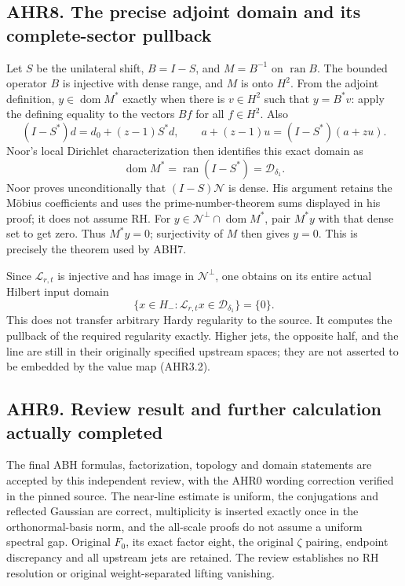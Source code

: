 \subsection{AHR8. The precise adjoint domain and its complete-sector
pullback}\label{ahr8.-the-precise-adjoint-domain-and-its-complete-sector-pullback}

Let \(S\) be the unilateral shift, \(B=I-S\), and \(M=B^{-1}\) on
\(\operatorname{ran}B\). The bounded operator \(B\) is injective with
dense range, and \(M\) is onto \(H^2\). From the adjoint definition,
\(y\in\operatorname{dom}M^*\) exactly when there is \(v\in H^2\) such
that \(y=B^*v\): apply the defining equality to the vectors \(Bf\) for
all \(f\in H^2\). Also \[
(I-S^*)d=d_0+(z-1)S^*d,
\qquad a+(z-1)u=(I-S^*)(a+zu).
\] Noor's local Dirichlet characterization then identifies this exact
domain as \[
\operatorname{dom}M^*=\operatorname{ran}(I-S^*)=\mathcal D_{\delta_1}.
\tag{AHR8.1}
\] Noor proves unconditionally that \((I-S)\mathcal N\) is dense. His
argument retains the Möbius coefficients and uses the
prime-number-theorem sums displayed in his proof; it does not assume RH.
For \(y\in\mathcal N^\perp\cap\operatorname{dom}M^*\), pair \(M^*y\)
with that dense set to get zero. Thus \(M^*y=0\); surjectivity of \(M\)
then gives \(y=0\). This is precisely the theorem used by ABH7.

Since \(\mathcal L_{r,t}\) is injective and has image in
\(\mathcal N^\perp\), one obtains on its entire actual Hilbert input
domain \[
\{x\in H_-:\mathcal L_{r,t}x\in\mathcal D_{\delta_1}\}=\{0\}.
\tag{AHR8.2}
\] This does not transfer arbitrary Hardy regularity to the source. It
computes the pullback of the required regularity exactly. Higher jets,
the opposite half, and the line are still in their originally specified
upstream spaces; they are not asserted to be embedded by the value map
(AHR3.2).

\subsection{AHR9. Review result and further calculation actually
completed}\label{ahr9.-review-result-and-further-calculation-actually-completed}

The final ABH formulas, factorization, topology and domain statements
are accepted by this independent review, with the AHR0 wording
correction verified in the pinned source. The near-line estimate is
uniform, the conjugations and reflected Gaussian are correct,
multiplicity is inserted exactly once in the orthonormal-basis norm, and
the all-scale proofs do not assume a uniform spectral gap. Original
\(F_0\), its exact factor eight, the original \(\zeta\) pairing,
endpoint discrepancy and all upstream jets are retained. The review
establishes no RH resolution or original weight-separated lifting
vanishing.

